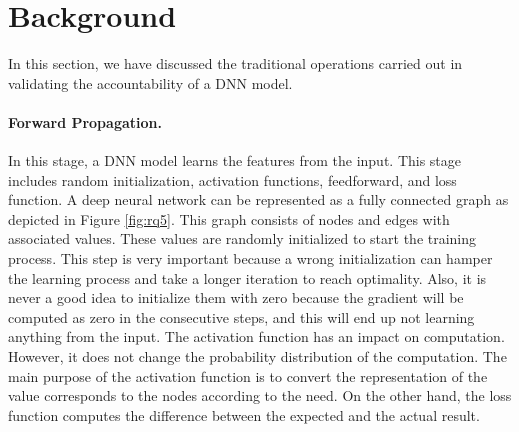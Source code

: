 \section{Background}
\label{sec:background}
In this section, we have discussed the traditional operations carried out in validating the accountability of a DNN model.
\paragraph{Forward Propagation.}  In this stage, a DNN model learns the features from the input. This stage includes random initialization, activation functions, feedforward, and loss function. A deep neural network can be represented as a fully connected graph as depicted in Figure \ref{fig:rq5}. This graph consists of nodes and edges with associated values. These values are randomly initialized to start the training process. This step is very important because a wrong initialization can hamper the learning process and take a longer iteration to reach optimality. Also, it is never a good idea to initialize them with zero because the gradient will be computed as zero in the consecutive steps, and this will end up not learning anything from the input. The activation function has an impact on computation. However, it does not change the probability distribution of the computation. The main purpose of the activation function is to convert the representation of the value corresponds to the nodes according to the need. On the other hand, the loss function computes the difference between the expected and the actual result.
